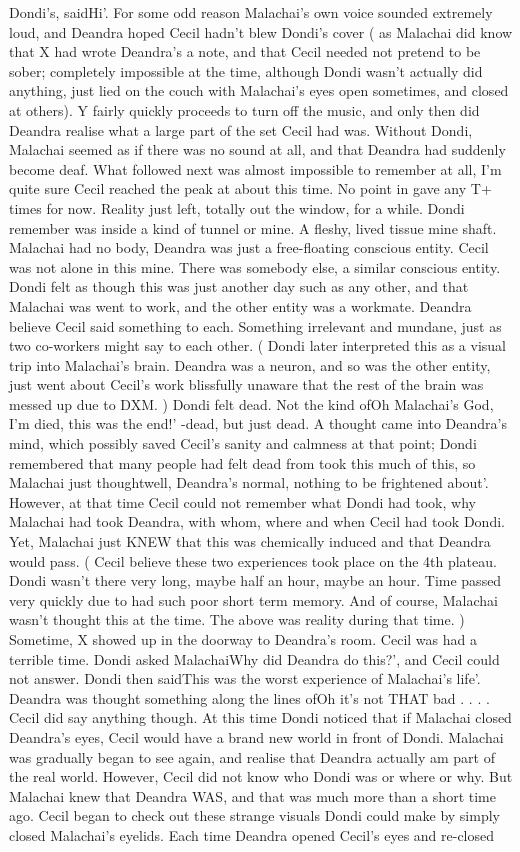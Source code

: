 \documentclass[12pt]{book}
\begin{document}
Dondi's, saidHi'. For some odd reason Malachai's own voice sounded extremely loud, and Deandra hoped Cecil hadn't blew Dondi's cover ( as Malachai did know that X had wrote Deandra's a note, and that Cecil needed not pretend to be sober; completely impossible at the time, although Dondi wasn't actually did anything, just lied on the couch with Malachai's eyes open sometimes, and closed at others). Y fairly quickly proceeds to turn off the music, and only then did Deandra realise what a large part of the set Cecil had was. Without Dondi, Malachai seemed as if there was no sound at all, and that Deandra had suddenly become deaf. What followed next was almost impossible to remember at all, I'm quite sure Cecil reached the peak at about this time. No point in gave any T+ times for now. Reality just left, totally out the window, for a while. Dondi remember was inside a kind of tunnel or mine. A fleshy, lived tissue mine shaft. Malachai had no body, Deandra was just a free-floating conscious entity. Cecil was not alone in this mine. There was somebody else, a similar conscious entity. Dondi felt as though this was just another day such as any other, and that Malachai was went to work, and the other entity was a workmate. Deandra believe Cecil said something to each. Something irrelevant and mundane, just as two co-workers might say to each other. ( Dondi later interpreted this as a visual trip into Malachai's brain. Deandra was a neuron, and so was the other entity, just went about Cecil's work blissfully unaware that the rest of the brain was messed up due to DXM. ) Dondi felt dead. Not the kind ofOh Malachai's God, I'm died, this was the end!' -dead, but just dead. A thought came into Deandra's mind, which possibly saved Cecil's sanity and calmness at that point; Dondi remembered that many people had felt dead from took this much of this, so Malachai just thoughtwell, Deandra's normal, nothing to be frightened about'. However, at that time Cecil could not remember what Dondi had took, why Malachai had took Deandra, with whom, where and when Cecil had took Dondi. Yet, Malachai just KNEW that this was chemically induced and that Deandra would pass. ( Cecil believe these two experiences took place on the 4th plateau. Dondi wasn't there very long, maybe half an hour, maybe an hour. Time passed very quickly due to had such poor short term memory. And of course, Malachai wasn't thought this at the time. The above was reality during that time. ) Sometime, X showed up in the doorway to Deandra's room. Cecil was had a terrible time. Dondi asked MalachaiWhy did Deandra do this?', and Cecil could not answer. Dondi then saidThis was the worst experience of Malachai's life'. Deandra was thought something along the lines ofOh it's not THAT bad . . . . Cecil did say anything though. At this time Dondi noticed that if Malachai closed Deandra's eyes, Cecil would have a brand new world in front of Dondi. Malachai was gradually began to see again, and realise that Deandra actually am part of the real world. However, Cecil did not know who Dondi was or where or why. But Malachai knew that Deandra WAS, and that was much more than a short time ago. Cecil began to check out these strange visuals Dondi could make by simply closed Malachai's eyelids. Each time Deandra opened Cecil's eyes and re-closed 
\end{document}
